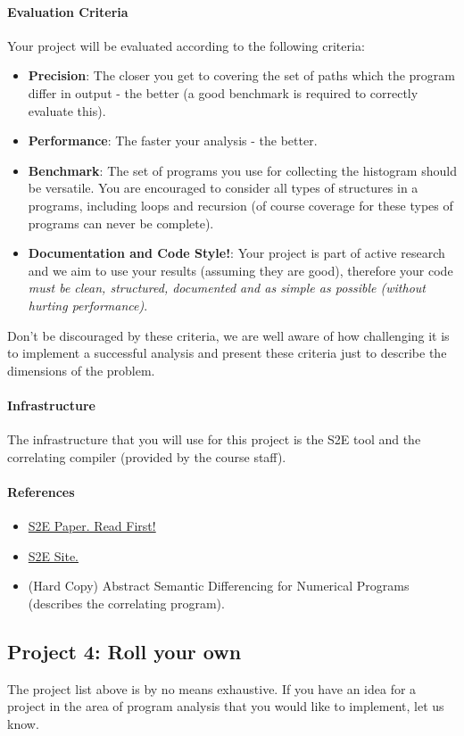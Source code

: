 \documentclass[english]{article}
\begin{document}
\paragraph{Evaluation Criteria}
Your project will be evaluated according to the following criteria:
\begin{itemize}
\item \textbf{Precision}: The closer you get to covering the set of paths which the program differ in output - the better (a good benchmark is required to correctly evaluate this).
\item \textbf{Performance}: The faster your analysis - the better.
\item \textbf{Benchmark}: The set of programs you use for collecting the histogram should be versatile. You are encouraged to consider all types of structures in a programs, including loops and recursion (of course coverage for these types of programs can never be complete).
\item \textbf{Documentation and Code Style!}: Your project is part of active research and we aim to use your results (assuming they are good), therefore your code \emph{must be clean, structured, documented and as simple as possible (without hurting performance)}.
\end{itemize}
Don't be discouraged by these criteria, we are well aware of how challenging it is to implement a successful analysis and present these criteria just to describe the dimensions of the problem.
\paragraph{Infrastructure} The infrastructure that you will use for this project is the S2E tool and the correlating compiler (provided by the course staff).
\paragraph{References}
\begin{itemize}
\item \href{http://dslab.epfl.ch/pubs/s2e.pdf}{S2E Paper. Read First!}
\item \href{http://dslab.epfl.ch/proj/s2e}{S2E Site.}
\item (Hard Copy) Abstract Semantic Differencing for Numerical Programs (describes the correlating program).
\end{itemize}

\subsection*{Project 4: Roll your own}
The project list above is by no means exhaustive. If you have an idea for a project in the area of program analysis that you would like to implement, let us know.
\end{document}
